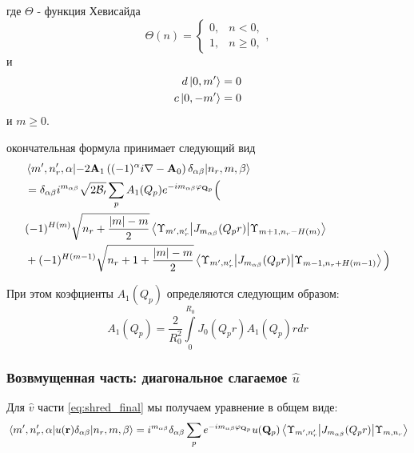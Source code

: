 \documentclass[a4paper,article,14pt]{extarticle}
\begin{document}
\noindent где $\Theta$ - функция Хевисайда
$$
\Theta(n)=\begin{cases} 0, & n < 0, \\ 1, & n \ge 0, \end{cases},
$$
и
\begin{equation}
\begin{aligned}
d \ket{0, m'} &= 0 \\
c \ket{0, -m'} &= 0 \\
\end{aligned}
\end{equation}
\noindent и $m \ge 0$.



\noindent окончательная формула принимает следующий вид
\begin{equation}
\begin{aligned}
&\mel{m', n'_r, \alpha} { - 2 \mathbf{A}_1 \left( (-1)^{\alpha} i \nabla - \mathbf{A}_0 \right) \delta_{\alpha \beta}} {n_r, m, \beta} \\
&= \delta_{\alpha \beta} i^{m_{\alpha \beta} }  \sqrt{ {2\cal{B}_0} } \sum\limits_{p}  A_{1} (Q_p) e^{- i m_{\alpha \beta}\varphi_{\mathbf{Q}_p}} \Big(  \\
&(-1)^{H(m)} \sqrt{  n_r + \frac{|m| - m}{2}  }   \mel{\Upsilon_{m', n'_r}} {J_{m_{\alpha \beta}} (Q_p r)} {\Upsilon_{m +1, n_r-H(m)}}  \\
&  + (-1)^{H(m-1)} \sqrt{n_r + 1 + \frac{|m| - m}{2}  }   \mel{\Upsilon_{m', n'_r}} {J_{m_{\alpha \beta}} (Q_p r)} {\Upsilon_{m-1, n_r+H(m-1)}} 
\Big)
\end{aligned}
\end{equation}

При этом коэфциенты $A_{1} (Q_p)$ определяются следующим образом:
\begin{equation}
A_{1} (Q_p) = \frac{2}{R_0^2}  \int\limits_{0}^{R_0}  J_{0} (Q_p r ) A_1(Q_p) r dr 
\end{equation} 

\subsubsection{Возвмущенная часть: диагональное слагаемое $\hat u$}
Для  $\hat v$ части \eqref{eq:shred_final} мы получаем уравнение в общем виде:
\begin{equation}
\mel{m', n'_r,\alpha} {u(\mathbf{r})  \delta_{\alpha \beta}}{n_r,m, \beta} = i^{m_{\alpha \beta} }  \delta_{\alpha \beta} \sum\limits_{p}      e^{- i m_{\alpha \beta} \varphi_{\mathbf{Q}_p}} u(\mathbf{Q}_p)\mel{\Upsilon_{m', n'_r}} {J_{m_{\alpha \beta}} (Q_p r) }{\Upsilon_{m, n_r}}
\end{equation}
\end{document}
